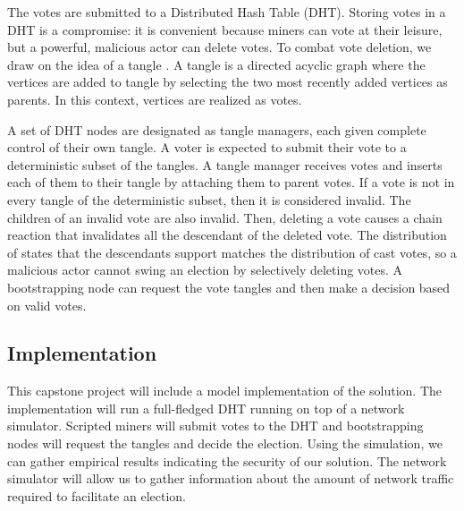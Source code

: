 The votes are submitted to a Distributed Hash Table (DHT).
Storing votes in a DHT is a compromise: it is convenient because miners can vote at their leisure, but a powerful, malicious actor can delete votes.
To combat vote deletion, we draw on the idea of a tangle \cite{popov2016Tangle}.
A tangle is a directed acyclic graph where the vertices are added to tangle by selecting the two most recently added vertices as parents.
In this context, vertices are realized as votes.



A set of DHT nodes are designated as tangle managers, each given complete control of their own tangle.
A voter is expected to submit their vote to a deterministic subset of the tangles.
A tangle manager receives votes and inserts each of them to their tangle by attaching them to parent votes.
If a vote is not in every tangle of the deterministic subset, then it is considered invalid.
The children of an invalid vote are also invalid.
Then, deleting a vote causes a chain reaction that invalidates all the descendant of the deleted vote.
The distribution of states that the descendants support matches the distribution of cast votes, so a malicious actor cannot swing an election by selectively deleting votes.
A bootstrapping node can request the vote tangles and then make a decision based on valid votes.



\subsection{Implementation}

This capstone project will include a model implementation of the solution.
The implementation will run a full-fledged DHT running on top of a network simulator.
Scripted miners will submit votes to the DHT and bootstrapping nodes will request the tangles and decide the election.
Using the simulation, we can gather empirical results indicating the security of our solution.
The network simulator will allow us to gather information about the amount of network traffic required to facilitate an election.